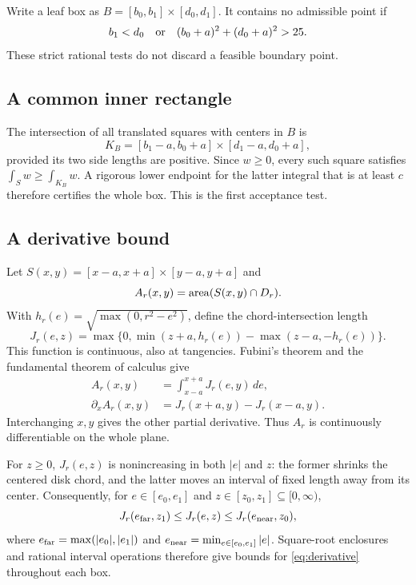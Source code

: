 \documentclass[11pt]{article}
\begin{document}
Write a leaf box as $B=[b_0,b_1]\times[d_0,d_1]$. It contains no admissible point if
\begin{equation}\label{eq:excluded}
b_1<d_0\quad\hbox{or}\quad(b_0+a)^2+(d_0+a)^2>25.
\end{equation}
These strict rational tests do not discard a feasible boundary point.

\subsection{A common inner rectangle}
The intersection of all translated squares with centers in $B$ is
\[
K_B=[b_1-a,b_0+a]\times[d_1-a,d_0+a],
\]
provided its two side lengths are positive. Since $w\ge0$, every such square satisfies $\int_Sw\ge\int_{K_B}w$. A rigorous lower endpoint for the latter integral that is at least $c$ therefore certifies the whole box. This is the first acceptance test.

\subsection{A derivative bound}
Let $S(x,y)=[x-a,x+a]\times[y-a,y+a]$ and
\[
A_r(x,y)=\operatorname{area}(S(x,y)\cap D_r).
\]
With $h_r(e)=\sqrt{\max(0,r^2-e^2)}$, define the chord-intersection length
\begin{equation}\label{eq:chord}
J_r(e,z)=\max\{0,\min(z+a,h_r(e))-\max(z-a,-h_r(e))\}.
\end{equation}
This function is continuous, also at tangencies. Fubini's theorem and the fundamental theorem of calculus give
\begin{equation}\label{eq:derivative}
\begin{split}
A_r(x,y)&=\int_{x-a}^{x+a}J_r(e,y)\,de,\\
\partial_x A_r(x,y)&=J_r(x+a,y)-J_r(x-a,y).
\end{split}
\end{equation}
Interchanging $x,y$ gives the other partial derivative. Thus $A_r$ is continuously differentiable on the whole plane.

For $z\ge0$, $J_r(e,z)$ is nonincreasing in both $|e|$ and $z$: the former shrinks the centered disk chord, and the latter moves an interval of fixed length away from its center. Consequently, for $e\in[e_0,e_1]$ and $z\in[z_0,z_1]\subseteq[0,\infty)$,
\[
J_r(e_{\rm far},z_1)\le J_r(e,z)\le J_r(e_{\rm near},z_0),
\]
where $e_{\rm far}=\max(|e_0|,|e_1|)$ and $e_{\rm near}=\min_{e\in[e_0,e_1]}|e|$. Square-root enclosures and rational interval operations therefore give bounds for \eqref{eq:derivative} throughout each box.
\end{document}
